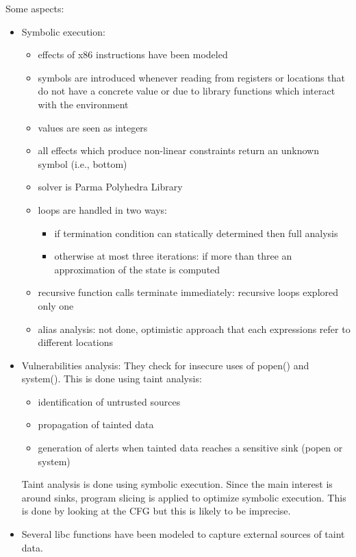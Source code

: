 \documentclass[10pt, a4paper]{article}
\begin{document}
Some aspects:
\begin{itemize}
  \item Symbolic execution:
    \begin{itemize}
      \item effects of x86 instructions have been modeled
      \item symbols are introduced whenever reading from registers or locations that do not have a concrete value or due to library functions which interact with the environment
      \item values are seen as integers
      \item all effects which produce non-linear constraints return an unknown symbol (i.e., bottom)
      \item solver is Parma Polyhedra Library
      \item loops are handled in two ways:
        \begin{itemize}
          \item if termination condition can statically determined then full analysis
          \item otherwise at most three iterations: if more than three an approximation of the state is computed
        \end{itemize}
      \item recursive function calls terminate immediately: recursive loops explored only one
      \item alias analysis: not done, optimistic approach that each expressions refer to different locations
    \end{itemize}
  \item Vulnerabilities analysis: They check for insecure uses of popen() and system(). This is done using taint analysis:
    \begin{itemize}
      \item identification of untrusted sources
      \item propagation of tainted data
      \item generation of alerts when tainted data reaches a sensitive sink (popen or system)
    \end{itemize}
    Taint analysis is done using symbolic execution. Since the main interest is around sinks, program slicing is applied to optimize symbolic execution. This is done by looking at the CFG but this is likely to be imprecise.
  \item Several libc functions have been modeled to capture external sources of taint data.
\end{itemize} 
\end{document}
